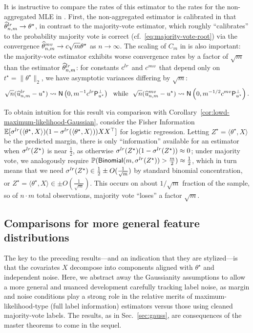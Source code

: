 \documentclass[11pt]{article}
\newcommand{\E}{\mathbb{E}}
\renewcommand{\P}{\mathbb{P}}
\newcommand{\what}[1]{\widehat{#1}}
\newcommand{\normal}{\mathsf{N}}
\newcommand{\bindist}{\mathsf{Binomial}}
\newcommand{\lr}{^{\textup{lr}}}
\newcommand{\mv}{^{\textup{mv}}}
\newcommand{\proj}{\mathsf{P}}
\newcommand{\norms}[1]{\|{#1}\|} %
\newcommand{\ltwos}[1]{\norms{#1}_2} %
\newcommand{\<}{\langle} %
\renewcommand{\>}{\rangle}
\newcommand{\cd}{\rightsquigarrow}
\newcommand{\half}{\frac{1}{2}}
\newcommand{\opt}{^\star}
\newcommand{\tmle}{\what{\theta}\lr_{n,m}} %
\newcommand{\mve}{\what{\theta}\mv_{n,m}} %
\begin{document}
It is instructive to compare the rates of this estimator to the rates
for the non-aggregated MLE
in . First, the non-aggregated
estimator is calibrated in that $\tmle \to \theta\opt$, in contrast to the
majority-vote estimator, which roughly
``calibrates'' to the probability majority vote is correct
(cf.~\eqref{eq:majority-vote-root}) via the convergence
$\mve \to c \sqrt{m} \theta\opt$ as $n
\to \infty$.  The scaling of $C_m$ in
 is also important: the majority-vote
estimator exhibits worse convergence rates by a factor of $\sqrt{m}$ than
the estimator $\what{\theta}\lr_{n,m}$: for constants $c\lr$ and $c\mv$ that
depend only on $t\opt = \ltwos{\theta\opt}$, we have asymptotic variances
differing by $\sqrt{m}$:
\begin{equation*}
	\sqrt{n}(\what{u}\lr_{n,m} - u\opt) \cd
	\normal\left(0, m^{-1} c\lr \proj_{u\opt}^\perp\right)
	~~ \mbox{while} ~~
	\sqrt{n}(\what{u}\mv_{n,m} - u\opt) \cd
	\normal\left(0, m^{-1/2} c\mv \proj_{u\opt}^\perp\right).
\end{equation*}

To obtain intuition for this result via comparison with
Corollary~\ref{cor:lowd-maximum-likelihood-Gaussian}, consider the Fisher
Information $\E[\sigma\lr(\<\theta\opt, X\>) (1 - \sigma\lr(\<\theta\opt,
  X\>)) XX^\top]$ for logistic regression. Letting $Z\opt = \<\theta\opt,
X\>$ be the predicted margin, there is only ``information'' available for an
estimator when $\sigma\lr(Z\opt)$ is near $\half$, as otherwise
$\sigma\lr(Z\opt)(1 - \sigma\lr(Z\opt)) \approx 0$; under majority vote, we
analogously require $\P(\bindist(m, \sigma\lr(Z\opt)) > \frac{m}{2}) \approx
\half$, which in turn means that we need $\sigma\lr(Z\opt) \in \half \pm
O(\frac{1}{\sqrt{m}})$ by standard binomial concentration, or $Z\opt =
\<\theta\opt, X\> \in \pm O(\frac{1}{\sqrt{m}})$.  This occurs on about
$1/\sqrt{m}$ fraction of the sample, so of $n \cdot m$ total observations,
majority vote ``loses'' a factor $\sqrt{m}$.

\newcommand{\mt}{$\textsc{M}_\beta$}

\subsection{Comparisons for more general feature distributions}
\label{sec:non-gauss}

The key to the preceding results---and an indication that they are
stylized---is that the covariates $X$ decompose into components aligned with
$\theta\opt$ and independent noise. Here, we abstract away the Gaussianity
assumptions to allow a more general and nuanced development carefully
tracking label noise, as margin and noise conditions play a
strong role in the relative merits of maximum-likelihood-type (full label
information) estimators versus those using cleaned majority-vote labels. The
results, as in Sec.~\ref{sec:gauss}, are consequences of the master theorems
to come in the sequel.
\end{document}
